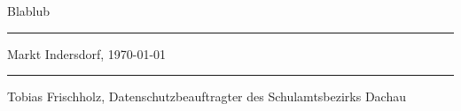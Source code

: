 \documentclass[a4paper, parskip]{scrartcl}
\title{}
\author{Tobias Frischholz, DSB}
\date{\today}
\begin{document}
\maketitle

Blablub

\vspace{2cm}

\parbox{6cm}{\hrule
\strut \footnotesize Markt Indersdorf, \today}
\hfill\parbox{7cm}{\hrule
\strut \footnotesize Tobias Frischholz, Datenschutzbeauftragter des Schulamtsbezirks Dachau}
\end{document}
